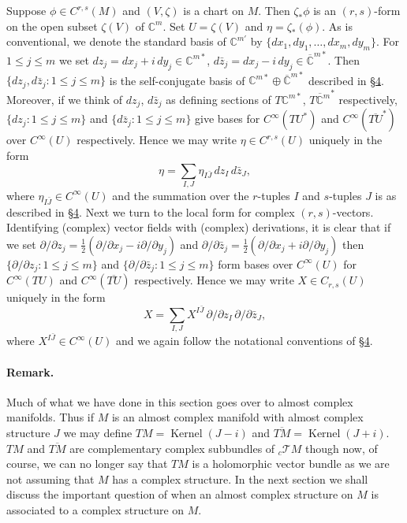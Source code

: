 Suppose $\phi\in C^{r,s}(M)$ and $(V,\zeta)$ is a chart on $M$. Then $\zeta_*\phi$ is an $(r,s)$-form on the open subset $\zeta(V)$ of $\mathbb C^m$. Set $U=\zeta(V)$ and $\eta=\zeta_*(\phi)$. As is conventional, we denote the standard basis of $\mathbb C^{m\prime}$ by $\{dx_1,dy_1,\ldots,dx_m,dy_m\}$. For $1\leq j\leq m$ we set $dz_j=dx_j+i\,dy_j\in\mathbb C^{m*}$, $d\bar z_j=dx_j-i\,dy_j\in\overline{\mathbb C}^{m*}$. Then $\{dz_j,d\bar z_j:1\leq j\leq m\}$ is the self-conjugate basis of $\mathbb C^{m*}\oplus\overline{\mathbb C}^{m*}$ described in \hyperref[sec:5:4]{\S4}. Moreover, if we think of $dz_j$, $d\bar z_j$ as defining sections of $T\mathbb C^{m*}$, $\overline{T\mathbb C^m}^*$ respectively, $\{dz_j:1\leq j\leq m\}$ and $\{d\bar z_j:1\leq j\leq m\}$ give bases for $C^\infty(TU^*)$ and $C^\infty(\overline{TU}^*)$ over $C^\infty(U)$ respectively. Hence we may write $\eta\in C^{r,s}(U)$ uniquely in the form
\[\eta=\sum_{I,J}\eta_{I\bar J}\,dz_I\,d\bar z_J,\]
where $\eta_{I\bar J}\in C^\infty(U)$ and the summation over the $r$-tuples $I$ and $s$-tuples $J$ is as described in \hyperref[sec:5:4]{\S4}. Next we turn to the local form for complex $(r,s)$-vectors. Identifying (complex) vector fields with (complex) derivations, it is clear that if we set $\partial/\partial z_j=\tfrac12(\partial/\partial x_j-i\partial/\partial y_j)$ and $\partial/\partial\bar z_j=\tfrac12(\partial/\partial x_j+i\partial/\partial y_j)$ then $\{\partial/\partial z_j:1\leq j\leq m\}$ and $\{\partial/\partial\bar z_j:1\leq j\leq m\}$ form bases over $C^\infty(U)$ for $C^\infty(TU)$ and $C^\infty(\overline{TU})$ respectively. Hence we may write $X\in C_{r,s}(U)$ uniquely in the form
\[X=\sum_{I,J}X^{I\bar J}\,\partial/\partial z_I\,\partial/\partial\bar z_J,\]
where $X^{I\bar J}\in C^\infty(U)$ and we again follow the notational conventions of \hyperref[sec:5:4]{\S4}.
\paragraph{Remark.} Much of what we have done in this section goes over to almost complex manifolds. Thus if $M$ is an almost complex manifold with almost complex structure $J$ we may define $TM=\operatorname{Kernel}(J-i)$ and $\overline{TM}=\operatorname{Kernel}(J+i)$. $TM$ and $\overline{TM}$ are complementary complex subbundles of ${}_c\mathcal TM$ though now, of course, we can no longer say that $TM$ is a holomorphic vector bundle as we are not assuming that $M$ has a complex structure. In the next section we shall discuss the important question of when an almost complex structure on $M$ is associated to a complex structure on $M$.
